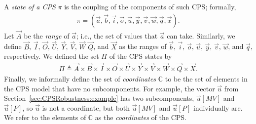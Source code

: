 \begin{definition}
\label{def:CPSRobustness:States}
A \emph{state of a CPS} $\pi$ is the coupling of the components of such CPS; formally, 
\begin{align}
\pi=(\vec{a},\vec{b},\vec{i},\vec{o},\vec{u},\vec{y},\vec{v},\vec{w},\vec{q},\vec{x}).
\end{align}
Let $\vec{A}$ be the \emph{range} of $\vec{a}$; i.e., the set of values that $\vec{a}$ can take. Similarly, we define $\vec{B}$, $\vec{I}$, $\vec{O}$, $\vec{U}$, $\vec{Y}$,  $\vec{V}$, $\vec{W}$ $\vec{Q}$, and $\vec{X}$ as the ranges of $\vec{b}$, $\vec{i}$, $\vec{o}$, $\vec{u}$, $\vec{y}$, $\vec{v}$, $\vec{w}$, and $\vec{q}$, respectively. We defined the set $\Pi$ of the CPS states by 
\begin{align}
  \Pi\triangleq \vec{A}\times\vec{B}\times\vec{I}\times\vec{O}\times\vec{U}\times\vec{Y}\times\vec{V}\times\vec{W}\times\vec{Q}\times\vec{X}.  
\end{align}
Finally, we informally define the set of \emph{coordinates} $\mathbb{C}$ to be the set of elements in the CPS model that have no subcomponents. For example, the vector $\vec{u}$ from Section~\ref{sec:CPSRobustness:example} has two subcomponents, $\vec{u}[MV]$ and $\vec{u}[P]$, so $\vec{u}$ is not a coordinate, but both $\vec{u}[MV]$ and $\vec{u}[P]$ individually are. We refer to the elements of $\mathbb{C}$ as the \emph{coordinates} of the CPS.
\end{definition}


